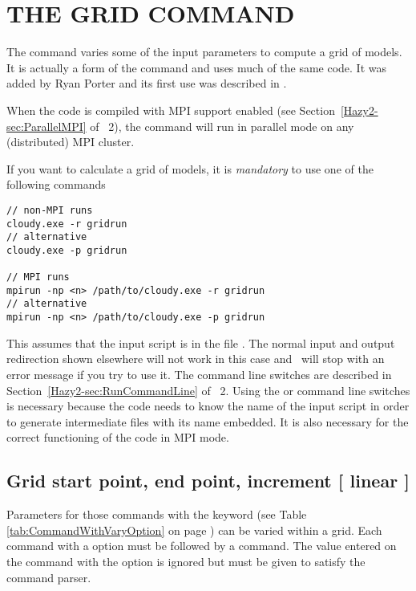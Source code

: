 \chapter{THE GRID COMMAND}
\label{sec:CommandGrid}

The  command varies some of the input parameters
to compute a grid of models.
It is actually a form of the  command and uses much
of the same code.
It was added by Ryan Porter and its first use was
described in \citet{Porter2006}.

When the code is
compiled with MPI support enabled (see Section~\ref{Hazy2-sec:ParallelMPI} of \Hazy~2),
the  command will run
in parallel mode on any (distributed) MPI cluster.

If you want to calculate a grid of models, it is {\em mandatory} to use one of the
following commands
\begin{verbatim}
// non-MPI runs
cloudy.exe -r gridrun
// alternative
cloudy.exe -p gridrun

// MPI runs
mpirun -np <n> /path/to/cloudy.exe -r gridrun
// alternative
mpirun -np <n> /path/to/cloudy.exe -p gridrun
\end{verbatim}
This assumes that the input script is in the file . The
normal input and output redirection shown elsewhere will not work in this case
and \Cloudy\ will stop with an error message if you try to use it. The command
line switches are described in Section~\ref{Hazy2-sec:RunCommandLine} of
\Hazy~2. Using the  or  command line switches is
necessary because the code needs to know the name of the input script in order
to generate intermediate files with its name embedded. It is also necessary
for the correct functioning of the code in MPI mode.

\section{Grid start point, end point, increment [ linear ]}

Parameters for those commands with the  keyword
(see Table \ref{tab:CommandWithVaryOption}
on page \pageref{tab:CommandWithVaryOption}) can be varied
within a grid.
Each
command with a  option must be followed by a  command.
The value
entered on the command with the  option is
ignored but must be given
to satisfy the command parser.

